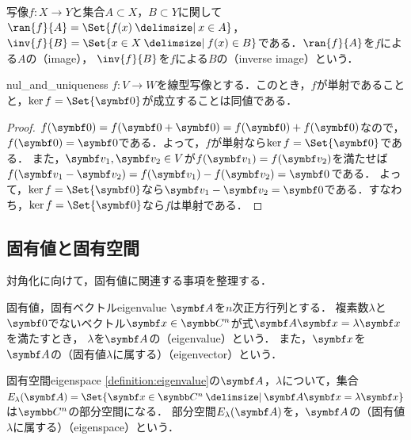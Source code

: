 \documentclass[../../main]{subfiles}
\begin{document}
\begin{note}
  写像\(f\colon X\to Y\)と集合\(A\subset X\)，\(B\subset Y\)に関して\(\ran{f}{A}=\Set{f(x)\given x\in A}\)，
  \(\inv{f}{B}=\Set{x\in X\given f(x)\in B}\)である．\(\ran{f}{A}\)を\(f\)による\(A\)の（image），
  \(\inv{f}{B}\)を\(f\)による\(B\)の（inverse image）という．
\end{note}

\begin{proposition}{}{nul_and_uniqueness}
  \(f\colon V\to W\)を線型写像とする．このとき，\(f\)が単射であることと，\(\nul f=\Set{\zvec}\)が成立することは同値である．
\end{proposition}

\begin{proof}
  \(f(\zvec)=f(\zvec+\zvec)=f(\zvec)+f(\zvec)\)なので，\(f(\zvec)=\zvec\)である．よって，\(f\)が単射なら\(\nul f=\Set{\zvec}\)である．
  また，\(\vect{v}_1,\vect{v}_2\in V\)が\(f(\vect{v}_1)=f(\vect{v}_2)\)を満たせば\(f(\vect{v}_1-\vect{v}_2)=f(\vect{v}_1)-f(\vect{v}_2)=\zvec\)である．
  よって，\(\nul f=\Set{\zvec}\)なら\(\vect{v}_1-\vect{v}_2=\zvec\)である．すなわち，\(\nul f=\Set{\zvec}\)なら\(f\)は単射である．
\end{proof}

\subsection{固有値と固有空間}

対角化に向けて，固有値に関連する事項を整理する．

\begin{definition}{固有値，固有ベクトル}{eigenvalue}
  \(\mat{A}\)を\(n\)次正方行列とする．
  複素数\(\lambda\)と\(\zvec\)でないベクトル\(\vect{x}\in\numset{C}^n\)が式\(\mat{A}\vect{x}=\lambda\vect{x}\)を満たすとき，
  \(\lambda\)を\(\mat{A}\)の（eigenvalue）という．
  また，\(\vect{x}\)を\(\mat{A}\)の（固有値\(\lambda\)に属する）（eigenvector）という．
\end{definition}

\begin{definition}{固有空間}{eigenspace}
  \cref{definition:eigenvalue}の\(\mat{A}\)，\(\lambda\)について，集合\(E_\lambda(\mat{A})=\Set{\vect{x}\in\numset{C}^n\given\mat{A}\vect{x}=\lambda\vect{x}}\)は\(\numset{C}^n\)の部分空間になる．
  部分空間\(E_\lambda(\mat{A})\)を，\(\mat{A}\)の（固有値\(\lambda\)に属する）（eigenspace）という．
\end{definition}
\end{document}
